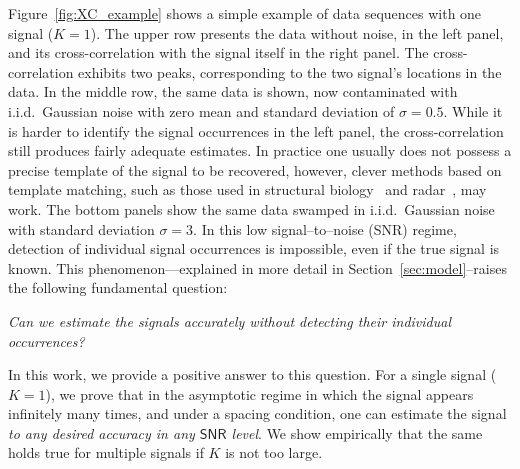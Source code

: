 \documentclass[english,11pt]{article}
\newcommand{\TODO}[1]{{\color{red}{[#1]}}}
\numberwithin{equation}{section}
\theoremstyle{plain}
\theoremstyle{definition}
\theoremstyle{remark}
\theoremstyle{plain}
\theoremstyle{remark}
\theoremstyle{plain}
\theoremstyle{plain}
\newcommand{\SNR}{{\textsf{SNR}}}
\begin{document}
Figure~\ref{fig:XC_example} shows a simple example of data sequences with  one signal ($K=1$).
The upper row presents the data without noise, in the left panel, and its cross-correlation with the signal itself in the right panel. The cross-correlation exhibits two peaks, corresponding to the two signal's locations in the data. 
In  the middle row, the same data is shown, now contaminated with i.i.d.\ Gaussian noise with zero mean and standard deviation of $\sigma=0.5$. 
While it is harder to identify the signal occurrences in the left panel, the cross-correlation still produces fairly adequate estimates. In practice one usually does not possess a precise template of the signal to be recovered, however, clever methods based on template matching, such as those used in structural biology~\cite{heimowitz2018apple} and radar~\cite{gogineni2017passive}, may work.
The bottom panels show the same data swamped in  
i.i.d.\ Gaussian noise with standard deviation  $\sigma=3$. In this  low signal--to--noise (\SNR) regime, 
detection of individual signal occurrences is impossible, 
even if the true signal is known. 
This phenomenon---explained in more detail in Section~\ref{sec:model}--raises the following fundamental question: 
\begin{center}
\emph{Can we estimate the signals accurately without detecting their individual occurrences? }  %
\end{center}

In this work, we provide a positive answer to this question. For a single signal ($K=1$), we prove that in the asymptotic regime in which the signal appears
infinitely many times, and under a spacing condition, one can estimate the signal \emph{to any desired accuracy in any $\SNR$ level}. We show empirically that the same holds true for multiple signals if $K$ is not too large. \TODO{Do we want a sentence like: Based on  recent results on the multireference alignment problem, we conjecture that it remains true as long as $K \lesssim L/6$. ? I am not sure it is necessary.}
\end{document}
